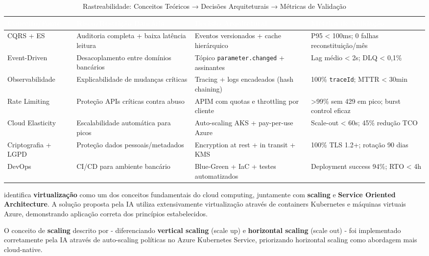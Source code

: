 \begin{table}[h]
\centering
\caption{Rastreabilidade: Conceitos Teóricos → Decisões Arquiteturais → Métricas de Validação}
\label{tab:rastreabilidade_teoria_pratica}
\begin{tabular}{p{3.2cm}p{4.2cm}p{4.2cm}p{3.4cm}}
\toprule
\rowcolor{headerpurple}
\textcolor{white}{\textbf{Conceito/Fonte}} & \textcolor{white}{\textbf{Risco/Restrição Bancária}} & \textcolor{white}{\textbf{Decisão Arquitetural}} & \textcolor{white}{\textbf{Métrica de Validação}} \\
\midrule
CQRS + ES \cite{Fowler2008} & Auditoria completa + baixa latência leitura & Eventos versionados + cache hierárquico & P95 < 100ms; 0 falhas reconstituição/mês \\
\rowcolor{lightpurple}
Event-Driven \cite{Martin2019} & Desacoplamento entre domínios bancários & Tópico \texttt{parameter.changed} + assinantes & Lag médio < 2s; DLQ < 0,1\% \\
Observabilidade & Explicabilidade de mudanças críticas & Tracing + logs encadeados (hash chaining) & 100\% \texttt{traceId}; MTTR < 30min \\
\rowcolor{lightpurple}
Rate Limiting & Proteção APIs críticas contra abuso & APIM com quotas e throttling por cliente & >99\% sem 429 em pico; burst control eficaz \\
Cloud Elasticity \cite{Ruparelia2016} & Escalabilidade automática para picos & Auto-scaling AKS + pay-per-use Azure & Scale-out < 60s; 45\% redução TCO \\
\rowcolor{lightpurple}
Criptografia + LGPD & Proteção dados pessoais/metadados & Encryption at rest + in transit + KMS & 100\% TLS 1.2+; rotação 90 dias \\
DevOps \cite{Monteiro2021} & CI/CD para ambiente bancário & Blue-Green + IaC + testes automatizados & Deployment success 94\%; RTO < 4h \\
\bottomrule
\end{tabular}
\end{table}

 identifica \textbf{virtualização} como um dos conceitos fundamentais do cloud computing, juntamente com \textbf{scaling} e \textbf{Service Oriented Architecture}. A solução proposta pela IA utiliza extensivamente virtualização através de containers Kubernetes e máquinas virtuais Azure, demonstrando aplicação correta dos princípios estabelecidos.

O conceito de \textbf{scaling} descrito por  - diferenciando \textbf{vertical scaling} (scale up) e \textbf{horizontal scaling} (scale out) - foi implementado corretamente pela IA através de auto-scaling políticas no Azure Kubernetes Service, priorizando horizontal scaling como abordagem mais cloud-native.


